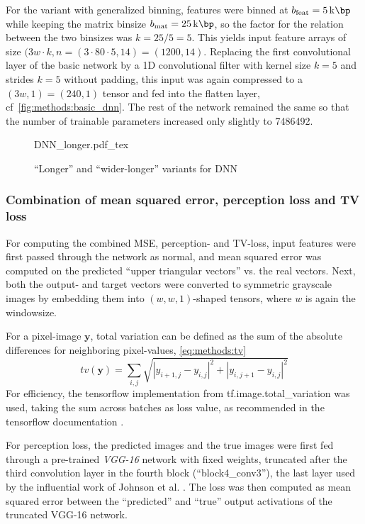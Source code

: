 For the variant with generalized binning, features were binned at $b_\textrm{feat} = \SI{5}{\kilo\bp}$ while keeping the matrix binsize $b_\textrm{mat} = \SI{25}{\kilo\bp}$,
so the factor for the relation between the two binsizes was $k=25/5=5$.
This yields input feature arrays of size $(3w\cdot k, n = (3\cdot80\cdot5 , 14) = (1200, 14)$.
Replacing the first convolutional layer of the basic network by a 1D convolutional filter with kernel size $k=5$ and strides $k=5$ without padding,
this input was again compressed to a $(3w, 1) = (240, 1)$ tensor and fed into the flatten layer, cf~\cref{fig:methods:basic_dnn}. 
The rest of the network remained the same so that the number of trainable parameters increased only slightly to \SI{7486492}{}.
\begin{figure}[p]
    \small
    \centering
    {DNN_longer.pdf_tex}
    \caption{``Longer'' and ``wider-longer'' variants for DNN}
    \label{fig:methods:longer_dnn}
\end{figure}

\subsubsection{Combination of mean squared error, perception loss and TV loss} \label{sec:methods:combined_loss}
For computing the combined MSE, perception- and TV-loss,
input features were first passed through the network as normal,
and mean squared error was computed on the predicted ``upper triangular vectors'' vs. the real vectors.
Next, both the output- and target vectors were converted to symmetric grayscale images by embedding them into 
$(w, w, 1)$-shaped tensors, where $w$ is again the windowsize.

For a pixel-image $\mathbf{y}$, total variation can be defined as the sum of the absolute differences for neighboring pixel-values, \cref{eq:methods:tv} \cite{Rudin1992}
\begin{equation}
 tv(\mathbf{y}) = \sum_{i,j}\sqrt{|y_{i+1,j} - y_{i,j}|^2 + |y_{i,j+1} - y_{i,j} |^2 } \label{eq:methods:tv}
\end{equation}
For efficiency, the tensorflow implementation from tf.image.total\_variation was used,
taking the sum across batches as loss value, as recommended in the tensorflow documentation \cite{TensorflowTV2020}.

For perception loss, the predicted images and the true images were first fed through a pre-trained \emph{VGG-16} network with fixed weights, truncated after the third convolution layer
in the fourth block (``block4\_conv3''), the last layer used by the influential work of Johnson et al. \cite{Johnson2016}.
The loss was then computed as mean squared error between the ``predicted'' and ``true'' output activations of the truncated VGG-16 network.

